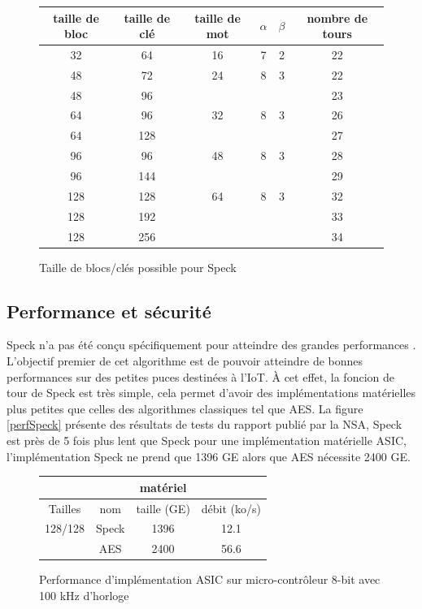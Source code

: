 		\begin{figure}[H]
			\centering
			\bgroup
			\def\arraystretch{1.2}
			\begin{tabular}{ccc|cc|c}
				taille de bloc & taille de clé & taille de mot & $\alpha$ & $\beta$ & nombre de tours \\
				\hline
				32 & 64  & 16 & 7 & 2 & 22 \\
				\hline
				48 & 72  & 24 & 8 & 3 & 22 \\
				48 & 96  &  & & & 23 \\
				\hline
				64 & 96  & 32 & 8 & 3 & 26 \\
				64 & 128 & &  & & 27 \\
				\hline
				96 & 96  & 48 & 8 & 3 & 28 \\
				96 & 144 & & & & 29 \\
				\hline
				128 & 128 & 64 & 8 & 3 & 32 \\
				128 & 192 & & & & 33 \\
				128 & 256 & & & & 34 \\
			\end{tabular}
			\egroup
			\caption{Taille de blocs/clés possible pour Speck}
		 	\label{tailleSpeck}
		\end{figure}

		\vspace{0.5cm}

		\subsection{Performance et sécurité}

			Speck n'a pas été conçu spécifiquement pour atteindre des grandes
			performances \cite{speck_families}. L'objectif premier de cet algorithme
			est de pouvoir atteindre de bonnes performances sur des petites puces
			destinées à l'IoT. À cet effet, la foncion de tour de Speck est très simple,
			cela permet d'avoir des implémentations matérielles plus petites que
			celles des algorithmes classiques tel que AES. La figure \ref{perfSpeck}
			présente des résultats de tests du rapport \cite{speck_micro} publié par la NSA,
			Speck est près de 5 fois plus lent que Speck pour une implémentation matérielle
			ASIC, l'implémentation Speck ne prend que 1396 GE alors que AES
			nécessite 2400 GE.

			\begin{figure}[H]
				\centering
				\bgroup
				\def\arraystretch{1.2}
				\begin{tabular}{cc|cc}
					& & \textbf{matériel} & \\
					\hline
					Tailles & nom & taille (GE) & débit (ko/s)\\
					\hline
					128/128 & Speck  & 1396 & 12.1 \\
					\hline
					 & AES  & 2400 & 56.6 \\
				\end{tabular}
				\egroup
				\caption{Performance d'implémentation ASIC sur micro-contrôleur 8-bit avec 100 kHz d'horloge \cite{speck_iot}}
				\label{tailleSpeck}
			\end{figure}

